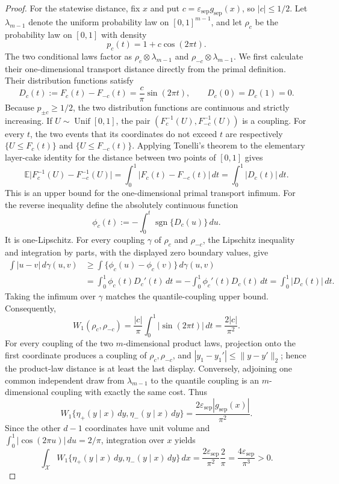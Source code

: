 \documentclass{article}
\begin{document}
\begin{proof}
For the statewise distance, fix \(x\) and put \(c=\varepsilon_{\mathrm{sep}}g_{\mathrm{sep}}(x)\), so \(|c|\le1/2\).  Let \(\lambda_{m-1}\) denote the uniform probability law on \([0,1]^{m-1}\), and let \(\rho_c\) be the probability law on \([0,1]\) with density
\[
p_c(t)=1+c\cos(2\pi t).
\]
The two conditional laws factor as \(\rho_c\otimes\lambda_{m-1}\) and \(\rho_{-c}\otimes\lambda_{m-1}\).  We first calculate their one-dimensional transport distance directly from the primal definition.  Their distribution functions satisfy
\[
D_c(t):=F_c(t)-F_{-c}(t)=\frac{c}{\pi}\sin(2\pi t),
\qquad D_c(0)=D_c(1)=0.
\]
Because \(p_{\pm c}\ge1/2\), the two distribution functions are continuous and strictly increasing.  If \(U\sim\operatorname{Unif}[0,1]\), the pair \((F_c^{-1}(U),F_{-c}^{-1}(U))\) is a coupling.  For every \(t\), the two events that its coordinates do not exceed \(t\) are respectively \(\{U\le F_c(t)\}\) and \(\{U\le F_{-c}(t)\}\).  Applying Tonelli's theorem to the elementary layer-cake identity for the distance between two points of \([0,1]\) gives
\[
\mathbb E\bigl|F_c^{-1}(U)-F_{-c}^{-1}(U)\bigr|
=\int_0^1|F_c(t)-F_{-c}(t)|\,dt
=\int_0^1|D_c(t)|\,dt.
\]
This is an upper bound for the one-dimensional primal transport infimum.  For the reverse inequality define the absolutely continuous function
\[
\phi_c(t):=-\int_0^t\operatorname{sgn}\{D_c(u)\}\,du.
\]
It is one-Lipschitz.  For every coupling \(\gamma\) of \(\rho_c\) and \(\rho_{-c}\), the Lipschitz inequality and integration by parts, with the displayed zero boundary values, give
\[
\begin{aligned}
\int|u-v|\,d\gamma(u,v)
&\ge \int\{\phi_c(u)-\phi_c(v)\}\,d\gamma(u,v)\\
&=\int_0^1\phi_c(t)D_c'(t)\,dt
=-\int_0^1\phi_c'(t)D_c(t)\,dt
=\int_0^1|D_c(t)|\,dt.
\end{aligned}
\]
Taking the infimum over \(\gamma\) matches the quantile-coupling upper bound.  Consequently,
\[
W_1(\rho_c,\rho_{-c})
=\frac{|c|}{\pi}\int_0^1|\sin(2\pi t)|\,dt
=\frac{2|c|}{\pi^2}.
\]
For every coupling of the two \(m\)-dimensional product laws, projection onto the first coordinate produces a coupling of \(\rho_c,\rho_{-c}\), and \(|y_1-y_1'|\le\|y-y'\|_2\); hence the product-law distance is at least the last display.  Conversely, adjoining one common independent draw from \(\lambda_{m-1}\) to the quantile coupling is an \(m\)-dimensional coupling with exactly the same cost.  Thus
\[
W_1\{\eta_+(y\mid x)\,dy,\eta_-(y\mid x)\,dy\}
=\frac{2\varepsilon_{\mathrm{sep}}|g_{\mathrm{sep}}(x)|}{\pi^2}.
\]
Since the other \(d-1\) coordinates have unit volume and \(\int_0^1|\cos(2\pi u)|\,du=2/\pi\), integration over \(x\) yields
\[
\int_{\mathcal X}W_1\{\eta_+(y\mid x)\,dy,\eta_-(y\mid x)\,dy\}\,dx
=\frac{2\varepsilon_{\mathrm{sep}}}{\pi^2}\frac{2}{\pi}
=\frac{4\varepsilon_{\mathrm{sep}}}{\pi^3}>0.
\]


\end{proof}
\end{document}
